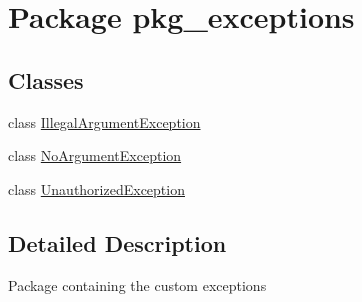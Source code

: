 \hypertarget{namespacepkg__exceptions}{\section{Package pkg\-\_\-exceptions}
\label{namespacepkg__exceptions}
}
\subsection*{Classes}
\begin{DoxyCompactItemize}
\item 
class \hyperlink{classpkg__exceptions_1_1IllegalArgumentException}{Illegal\-Argument\-Exception}
\item 
class \hyperlink{classpkg__exceptions_1_1NoArgumentException}{No\-Argument\-Exception}
\item 
class \hyperlink{classpkg__exceptions_1_1UnauthorizedException}{Unauthorized\-Exception}
\end{DoxyCompactItemize}


\subsection{Detailed Description}
Package containing the custom exceptions 